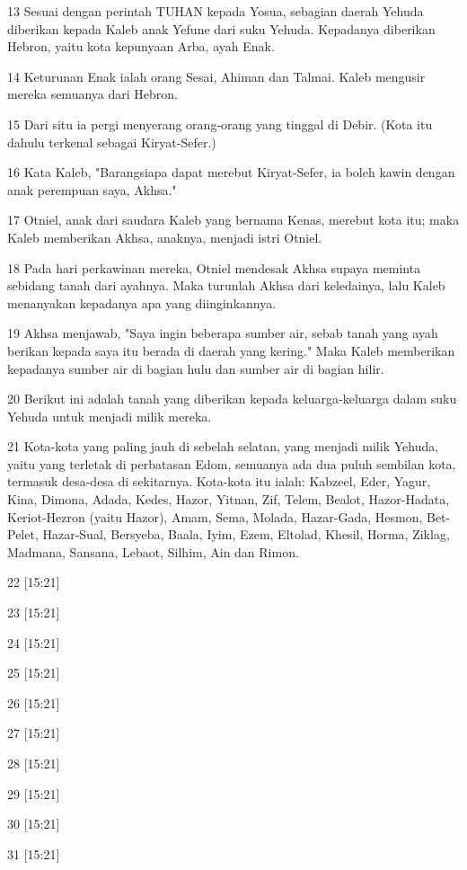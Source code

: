 \par 13 Sesuai dengan perintah TUHAN kepada Yosua, sebagian daerah Yehuda diberikan kepada Kaleb anak Yefune dari suku Yehuda. Kepadanya diberikan Hebron, yaitu kota kepunyaan Arba, ayah Enak.
\par 14 Keturunan Enak ialah orang Sesai, Ahiman dan Talmai. Kaleb mengusir mereka semuanya dari Hebron.
\par 15 Dari situ ia pergi menyerang orang-orang yang tinggal di Debir. (Kota itu dahulu terkenal sebagai Kiryat-Sefer.)
\par 16 Kata Kaleb, "Barangsiapa dapat merebut Kiryat-Sefer, ia boleh kawin dengan anak perempuan saya, Akhsa."
\par 17 Otniel, anak dari saudara Kaleb yang bernama Kenas, merebut kota itu; maka Kaleb memberikan Akhsa, anaknya, menjadi istri Otniel.
\par 18 Pada hari perkawinan mereka, Otniel mendesak Akhsa supaya meminta sebidang tanah dari ayahnya. Maka turunlah Akhsa dari keledainya, lalu Kaleb menanyakan kepadanya apa yang diinginkannya.
\par 19 Akhsa menjawab, "Saya ingin beberapa sumber air, sebab tanah yang ayah berikan kepada saya itu berada di daerah yang kering." Maka Kaleb memberikan kepadanya sumber air di bagian hulu dan sumber air di bagian hilir.
\par 20 Berikut ini adalah tanah yang diberikan kepada keluarga-keluarga dalam suku Yehuda untuk menjadi milik mereka.
\par 21 Kota-kota yang paling jauh di sebelah selatan, yang menjadi milik Yehuda, yaitu yang terletak di perbatasan Edom, semuanya ada dua puluh sembilan kota, termasuk desa-desa di sekitarnya. Kota-kota itu ialah: Kabzeel, Eder, Yagur, Kina, Dimona, Adada, Kedes, Hazor, Yitnan, Zif, Telem, Bealot, Hazor-Hadata, Keriot-Hezron (yaitu Hazor), Amam, Sema, Molada, Hazar-Gada, Hesmon, Bet-Pelet, Hazar-Sual, Bersyeba, Baala, Iyim, Ezem, Eltolad, Khesil, Horma, Ziklag, Madmana, Sansana, Lebaot, Silhim, Ain dan Rimon.
\par 22 [15:21]
\par 23 [15:21]
\par 24 [15:21]
\par 25 [15:21]
\par 26 [15:21]
\par 27 [15:21]
\par 28 [15:21]
\par 29 [15:21]
\par 30 [15:21]
\par 31 [15:21]
